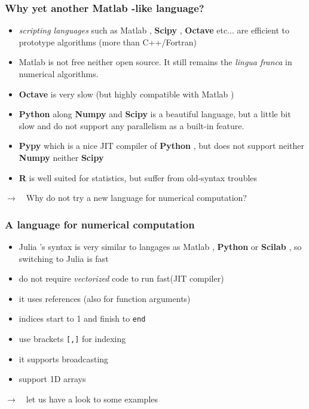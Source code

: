 \documentclass[11pt,mathserif]{beamer}
\newcommand{\fleche}{\alert{$\pmb{\longrightarrow}$}~~}
\newcommand{\scipy}{\textbf{Scipy}{} }
\newcommand{\numpy}{\textbf{Numpy}{} }
\newcommand{\julia}{{ Julia}{} }
\newcommand{\matlab}{{ Matlab}{} }
\newcommand{\octave}{\textbf{Octave}{} }
\newcommand{\scilab}{\textbf{Scilab}{} }
\newcommand{\python}{\textbf{Python}{} }
\begin{document}
\begin{frame}
\frametitle{Why yet another \matlab-like language?}
\begin{itemize}[<+->]
\item {\em scripting languages} such as \matlab, \scipy, \octave etc... are
efficient to prototype algorithms (more than C++/Fortran)
\item \matlab is not free neither open source. It still remains the {\em lingua franca}
in numerical algorithms. 
\item \octave is very slow (but highly compatible with \matlab)
\item \python along \numpy and \scipy is a beautiful language, but a little bit slow and do not
support any parallelism as a built-in feature. 
\item \textbf{Pypy} which is a nice JIT compiler of \python, but does not support neither \numpy neither \scipy
\item \textbf{R} is well suited for statistics, but suffer from old-syntax troubles
\end{itemize}
\pause
\fleche Why do not try a new language for numerical computation?
\end{frame}



\begin{frame}[fragile]
\frametitle{A language for numerical computation}
\begin{itemize}[<+->]
 \item \julia's syntax is very similar to langages as \matlab, \python or \scilab, so
  switching to \julia is fast
 \item do not require {\em vectorized} code to run fast(JIT compiler)
 \item it uses references (also for function arguments)
 \item indices start to 1 and finish to \texttt{end}
 \item use brackets \texttt{[,]} for indexing
 \item it supports broadcasting
 \item support 1D arrays
\end{itemize}
\pause
\fleche let us have a look to some examples
\end{frame}

\end{document}
